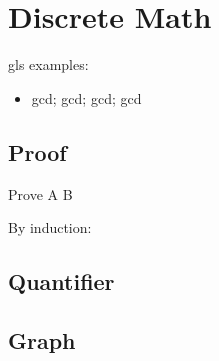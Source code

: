 \chapter{Discrete Math}\label{chp:discrete_math}

\minitoc

gls examples:
\begin{itemize}
	\item \Gls{gcd}; \acrlong{gcd}; \acrshort{gcd}; \acrfull{gcd}
\end{itemize}

\section{Proof}
\begin{lemma}
\end{lemma}
\begin{claim}
\end{claim}
\begin{theorem}
\end{theorem}
\begin{example}
\end{example}
\begin{fact}
\end{fact}
\begin{remark}
\end{remark}
\begin{exercise}
	Prove A \iff B
\end{exercise}
\begin{solution}
By induction:
\end{solution}

\lipsum %

\section{Quantifier}
\lipsum %

\section{Graph}
\cite{babaiGraphIsomorphismQuasipolynomial2016}

